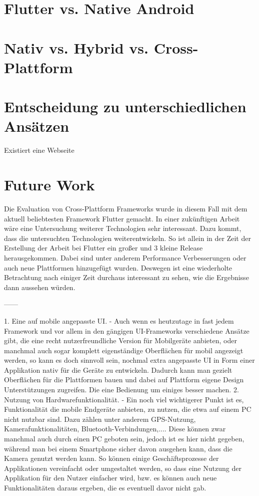 \section{Flutter vs. Native Android}
\section{Nativ vs. Hybrid vs. Cross-Plattform}

\section{Entscheidung zu unterschiedlichen Ansätzen}
Existiert eine Webseite

\section{Future Work}
Die Evaluation von Cross-Plattform Frameworks wurde in diesem Fall mit dem aktuell beliebtesten Framework Flutter gemacht. In einer zukünftigen Arbeit wäre eine Untersuchung weiterer Technologien sehr interessant. Dazu kommt, dass die untersuchten Technologien weiterentwickeln. So ist allein in der Zeit der Erstellung der Arbeit bei Flutter ein großer und 3 kleine Release herausgekommen. Dabei sind unter anderem Performance Verbesserungen oder auch neue Plattformen hinzugefügt wurden. Deswegen ist eine wiederholte Betrachtung nach einiger Zeit durchaus interessant zu sehen, wie die Ergebnisse dann aussehen würden.

------

1. Eine auf mobile angepasste UI. - Auch wenn es heutzutage in fast jedem Framework und vor allem in den gängigen UI-Frameworks verschiedene Ansätze gibt, die eine recht nutzerfreundliche Version für Mobilgeräte anbieten, oder manchmal auch sogar komplett eigenständige Oberflächen für mobil angezeigt werden, so kann es doch sinnvoll sein, nochmal extra angepasste UI in Form einer Applikation nativ für die Geräte zu entwickeln. Dadurch kann man gezielt Oberflächen für die Plattformen bauen und dabei auf Plattform eigene Design Unterstützungen zugreifen. Die eine Bedienung um einiges besser machen.
2. Nutzung von Hardwarefunktionalität. -  Ein noch viel wichtigerer Punkt ist es, Funktionalität die mobile Endgeräte anbieten, zu nutzen, die etwa auf einem PC nicht nutzbar sind. Dazu zählen unter anderem GPS-Nutzung, Kamerafunktionalitäten, Bluetooth-Verbindungen,.... Diese können zwar manchmal auch durch einen PC geboten sein, jedoch ist es hier nicht gegeben, während man bei einem Smartphone sicher davon ausgehen kann, dass die Kamera genutzt werden kann. So können einige Geschäftsprozesse der Applikationen vereinfacht oder umgestaltet werden, so dass eine Nutzung der Applikation für den Nutzer einfacher wird, bzw. es können auch neue Funktionalitäten daraus ergeben, die es eventuell davor nicht gab.


